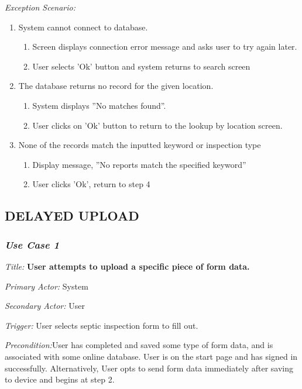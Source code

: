 \documentclass[twoside,letterpaper]{article}
\begin{document}
{\color{black} \textit{Exception Scenario:}}
\begin{enumerate}
\item System cannot connect to database.
\begin{enumerate}
\item Screen displays connection error message and asks user to try again later.
\item User selects 'Ok' button and system returns to search screen
\end{enumerate}

\item The database returns no record for the given location.
\begin{enumerate}
\item System displays ''No matches found''.
\item User clicks on 'Ok' button to return to the lookup by location screen.
\end{enumerate}

\item None of the records match the inputted keyword or inspection type
\begin{enumerate}
\item Display message, ''No reports match the specified keyword''
\item User clicks 'Ok', return to step 4
\end{enumerate}
\end{enumerate}

\subsection[DELAYED UPLOAD]
{\rmfamily\bfseries\color{black}
DELAYED UPLOAD}
\subsubsection{\textit{Use Case 1}}

\textit{Title: }{\bfseries\color{black}User attempts to upload a specific piece of form data.}

{\color{black} \textit{Primary Actor:} System}

{\color{black} \textit{Secondary Actor:} User}

{\color{black} \textit{Trigger:} User selects septic inspection form to fill out.}

{\color{black} \textit{Precondition:}User has completed and saved some type of form data, and is associated with some online database. User is on the start page and has signed in successfully. Alternatively, User opts to send form data immediately after saving to device and begins at step 2.}
\end{document}
